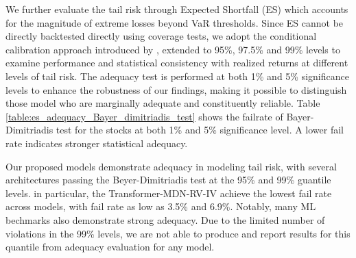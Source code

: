 We further evaluate the tail risk through Expected Shortfall (ES) which accounts for the magnitude of extreme losses beyond VaR thresholds. Since ES cannot be directly backtested directly using coverage tests, we adopt the conditional calibration approach introduced by \textcite{Bayer2020}, extended to 95\%, 97.5\% and 99\% levels to examine performance and statistical consistency with realized returns at different levels of tail risk. The adequacy test is performed at both 1\% and 5\% significance levels to enhance the robustness of our findings, making it possible to distinguish those model who are marginally adequate and constituently reliable. Table \ref{table:es_adequacy_Bayer_dimitriadis_test} shows the failrate of Bayer-Dimitriadis test for the stocks at both 1\% and 5\% significance level. A lower fail rate indicates stronger statistical adequacy.

Our proposed models demonstrate adequacy in modeling tail risk, with several architectures passing the Beyer-Dimitriadis test at the 95\% and 99\% guantile levels. in particular, the Transformer-MDN-RV-IV achieve the lowest fail rate across models, with fail rate as low as 3.5\% and 6.9\%. Notably, many ML bechmarks also demonstrate strong adequacy. Due to the limited number of violations in the 99\% levels, we are not able to produce and report results for this quantile from adequacy evaluation for any model. 


